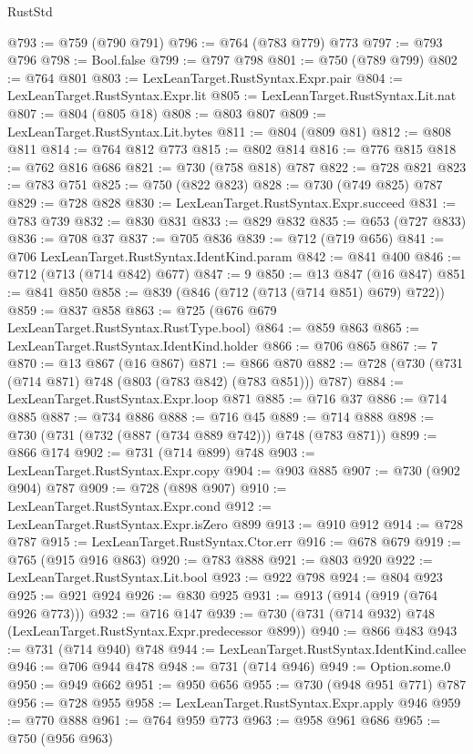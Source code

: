 \begin{lexlean}{RustStd}
\begin{coremodule}
@793 := @759 (@790 @791)
@796 := @764 (@783 @779) @773
@797 := @793 @796
@798 := Bool.false
@799 := @797 @798
@801 := @750 (@789 @799)
@802 := @764 @801
@803 := LexLeanTarget.RustSyntax.Expr.pair
@804 := LexLeanTarget.RustSyntax.Expr.lit
@805 := LexLeanTarget.RustSyntax.Lit.nat
@807 := @804 (@805 @18)
@808 := @803 @807
@809 := LexLeanTarget.RustSyntax.Lit.bytes
@811 := @804 (@809 @81)
@812 := @808 @811
@814 := @764 @812 @773
@815 := @802 @814
@816 := @776 @815
@818 := @762 @816 @686
@821 := @730 (@758 @818) @787
@822 := @728 @821
@823 := @783 @751
@825 := @750 (@822 @823)
@828 := @730 (@749 @825) @787
@829 := @728 @828
@830 := LexLeanTarget.RustSyntax.Expr.succeed
@831 := @783 @739
@832 := @830 @831
@833 := @829 @832
@835 := @653 (@727 @833)
@836 := @708 @37
@837 := @705 @836
@839 := @712 (@719 @656)
@841 := @706 LexLeanTarget.RustSyntax.IdentKind.param
@842 := @841 @400
@846 := @712 (@713 (@714 @842) @677)
@847 := 9
@850 := @13 @847 (@16 @847)
@851 := @841 @850
@858 := @839 (@846 (@712 (@713 (@714 @851) @679) @722))
@859 := @837 @858
@863 := @725 (@676 @679 LexLeanTarget.RustSyntax.RustType.bool)
@864 := @859 @863
@865 := LexLeanTarget.RustSyntax.IdentKind.holder
@866 := @706 @865
@867 := 7
@870 := @13 @867 (@16 @867)
@871 := @866 @870
@882 := @728 (@730 (@731 (@714 @871) @748 (@803 (@783 @842) (@783 @851))) @787)
@884 := LexLeanTarget.RustSyntax.Expr.loop @871
@885 := @716 @37
@886 := @714 @885
@887 := @734 @886
@888 := @716 @45
@889 := @714 @888
@898 := @730 (@731 (@732 (@887 (@734 @889 @742))) @748 (@783 @871))
@899 := @866 @174
@902 := @731 (@714 @899) @748
@903 := LexLeanTarget.RustSyntax.Expr.copy
@904 := @903 @885
@907 := @730 (@902 @904) @787
@909 := @728 (@898 @907)
@910 := LexLeanTarget.RustSyntax.Expr.cond
@912 := LexLeanTarget.RustSyntax.Expr.isZero @899
@913 := @910 @912
@914 := @728 @787
@915 := LexLeanTarget.RustSyntax.Ctor.err
@916 := @678 @679
@919 := @765 (@915 @916 @863)
@920 := @783 @888
@921 := @803 @920
@922 := LexLeanTarget.RustSyntax.Lit.bool
@923 := @922 @798
@924 := @804 @923
@925 := @921 @924
@926 := @830 @925
@931 := @913 (@914 (@919 (@764 @926 @773)))
@932 := @716 @147
@939 := @730 (@731 (@714 @932) @748 (LexLeanTarget.RustSyntax.Expr.predecessor @899))
@940 := @866 @483
@943 := @731 (@714 @940) @748
@944 := LexLeanTarget.RustSyntax.IdentKind.callee
@946 := @706 @944 @478
@948 := @731 (@714 @946)
@949 := Option.some.{0}
@950 := @949 @662
@951 := @950 @656
@955 := @730 (@948 @951 @771) @787
@956 := @728 @955
@958 := LexLeanTarget.RustSyntax.Expr.apply @946
@959 := @770 @888
@961 := @764 @959 @773
@963 := @958 @961 @686
@965 := @750 (@956 @963)

\end{coremodule}
\end{lexlean}

